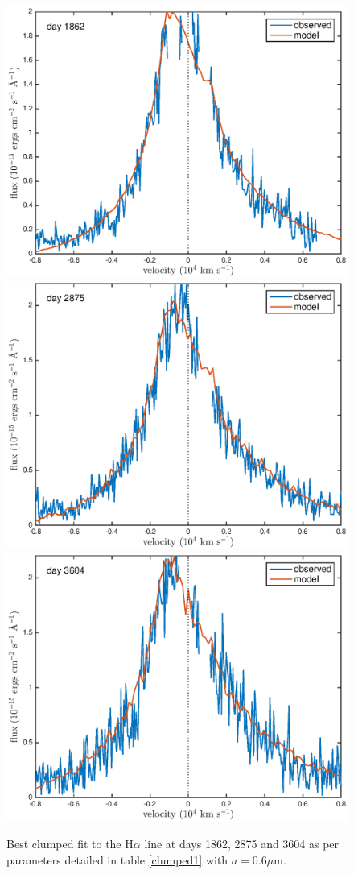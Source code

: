 \documentclass[useAMS,usenatbib,usegraphicx]{mnras}
\begin{document}
\begin{figure}
\begin{center}
\caption{Best clumped fit to the H$\alpha$ line at days 1862, 2875 and 
3604 as per parameters detailed in table \ref{clumped1} with $a=0.6\mu$m.}
\label{d1862_3604_c}
\includegraphics[trim =37 10 45 15,clip=true,scale=0.35]{clump_1/maximum/d1862Ha}
\includegraphics[trim =55 10 45 15,clip=true,scale=0.35]{clump_1/maximum/d2875Ha}
\includegraphics[trim =55 10 45 15,clip=true,scale=0.35]{clump_1/maximum/d3604Ha}

\end{center}
\end{figure}
\end{document}
